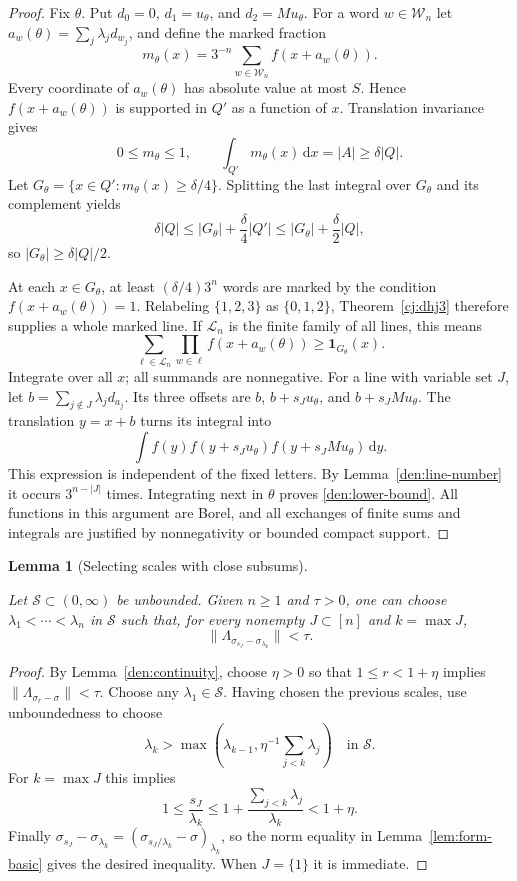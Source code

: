 \documentclass[11pt]{amsart}
\newcommand{\dd}{\,\mathrm d}
\newcommand{\one}{\mathbf 1}
\newtheorem{lemma}[theorem]{Lemma}
\theoremstyle{definition}
\theoremstyle{remark}
\numberwithin{equation}{section}
\providecommand{\lean}[1]{}
\providecommand{\leanok}{}
\begin{document}
\begin{proof}
Fix $\theta$.  Put $d_0=0$, $d_1=u_\theta$, and
$d_2=Mu_\theta$.  For a word $w\in\mathcal W_n$ let
$a_w(\theta)=\sum_j\lambda_jd_{w_j}$, and define the marked
fraction
\[
 m_\theta(x)=3^{-n}\sum_{w\in\mathcal W_n}
                     f(x+a_w(\theta)).
\]
Every coordinate of $a_w(\theta)$ has absolute value at most
$S$.  Hence $f(x+a_w(\theta))$ is supported in $Q'$ as a
function of $x$.  Translation invariance gives
\[
 0\le m_\theta\le1,
 \qquad \int_{Q'}m_\theta(x)\dd x=|A|\ge\delta|Q|.
\]
Let $G_\theta=\{x\in Q':m_\theta(x)\ge\delta/4\}$.
Splitting the last integral over $G_\theta$ and its complement
yields
\[
 \delta|Q|
 \le |G_\theta|+\frac{\delta}{4}|Q'|
 \le |G_\theta|+\frac{\delta}{2}|Q|,
\]
so $|G_\theta|\ge\delta|Q|/2$.

At each $x\in G_\theta$, at least $(\delta/4)3^n$ words are
marked by the condition $f(x+a_w(\theta))=1$.
Relabeling $\{1,2,3\}$ as $\{0,1,2\}$, Theorem~\ref{cj:dhj3}
therefore supplies a whole marked line.
If $\mathcal L_n$ is the finite family of all
lines, this means
\[
 \sum_{\ell\in\mathcal L_n}\prod_{w\in\ell}
               f(x+a_w(\theta))\ge\one_{G_\theta}(x).
\]
Integrate over all $x$; all summands are nonnegative.
For a line with variable set $J$, let
$b=\sum_{j\notin J}\lambda_jd_{a_j}$.  Its three offsets
are $b$, $b+s_Ju_\theta$, and $b+s_JMu_\theta$.
The translation $y=x+b$ turns its integral into
\[
 \int f(y)f(y+s_Ju_\theta)f(y+s_JMu_\theta)\dd y.
\]
This expression is independent of the fixed letters.  By
Lemma~\ref{den:line-number} it occurs $3^{n-|J|}$ times.
Integrating next in $\theta$ proves
\eqref{den:lower-bound}.  All functions in this argument are
Borel, and all exchanges of finite sums and integrals are
justified by nonnegativity or bounded compact support.
\end{proof}

\begin{lemma}[Selecting scales with close subsums]\label{den:select-scales}
\lean{Auto.den_select_scales}
\leanok
Let $\mathcal S\subset(0,\infty)$ be unbounded.  Given
$n\ge1$ and $\tau>0$, one can choose
$\lambda_1<\cdots<\lambda_n$ in $\mathcal S$ such that,
for every nonempty $J\subset[n]$ and $k=\max J$,
\[
 \|\Lambda_{\sigma_{s_J}-\sigma_{\lambda_k}}\|<\tau.
\]
\end{lemma}
\begin{proof}
By Lemma~\ref{den:continuity}, choose $\eta>0$ so that
$1\le r<1+\eta$ implies
$\|\Lambda_{\sigma_r-\sigma}\|<\tau$.
Choose any $\lambda_1\in\mathcal S$.  Having chosen the
previous scales, use unboundedness to choose
\[
 \lambda_k>\max\left(\lambda_{k-1},
                  \eta^{-1}\sum_{j<k}\lambda_j\right)
      \quad\text{in }\mathcal S.
\]
For $k=\max J$ this implies
\[
 1\le\frac{s_J}{\lambda_k}
    \le1+\frac{\sum_{j<k}\lambda_j}{\lambda_k}<1+\eta.
\]
Finally
$\sigma_{s_J}-\sigma_{\lambda_k}
  =(\sigma_{s_J/\lambda_k}-\sigma)_{\lambda_k}$,
so the norm equality in Lemma~\ref{lem:form-basic} gives
the desired inequality.  When $J=\{1\}$ it is immediate.
\end{proof}
\end{document}
